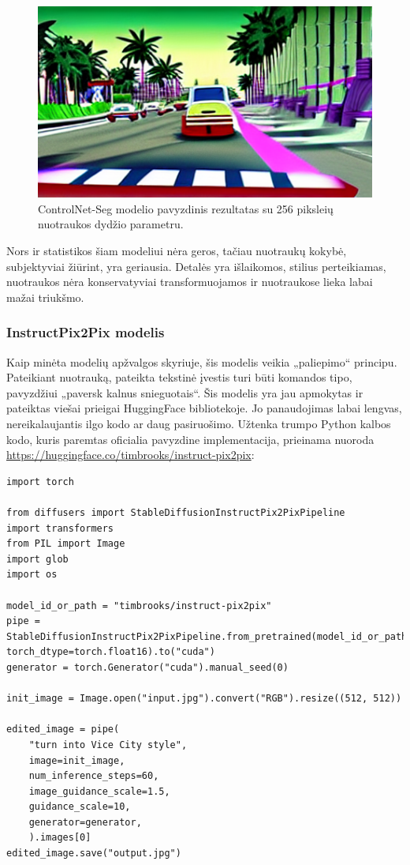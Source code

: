 \documentclass{VUMIFPSbakalaurinis}
\begin{document}
            \begin{figure}[H]
                \centering
                \includegraphics[scale=1]{img/diffusion/controlnet/256}
                \caption{ControlNet-Seg modelio pavyzdinis rezultatas su 256 piksleių nuotraukos dydžio parametru.}
                \label{img:mlp}
            \end{figure}

            Nors ir statistikos šiam modeliui nėra geros, tačiau nuotraukų kokybė, subjektyviai žiūrint, yra geriausia. Detalės yra išlaikomos, stilius perteikiamas, nuotraukos nėra konservatyviai transformuojamos ir nuotraukose lieka labai mažai triukšmo.

        \subsubsection{InstructPix2Pix modelis}
            Kaip minėta modelių apžvalgos skyriuje, šis modelis veikia „paliepimo“ principu. Pateikiant nuotrauką, pateikta tekstinė įvestis turi būti komandos tipo, pavyzdžiui „paversk kalnus snieguotais“. Šis modelis yra jau apmokytas ir pateiktas viešai prieigai HuggingFace bibliotekoje. Jo panaudojimas labai lengvas, nereikalaujantis ilgo kodo ar daug pasiruošimo. Užtenka trumpo Python kalbos kodo, kuris paremtas oficialia pavyzdine implementacija, prieinama nuoroda \href{https://huggingface.co/timbrooks/instruct-pix2pix}{https://huggingface.co/timbrooks/instruct-pix2pix}:

            \begin{lstlisting}
import torch

from diffusers import StableDiffusionInstructPix2PixPipeline
import transformers
from PIL import Image
import glob
import os

model_id_or_path = "timbrooks/instruct-pix2pix"
pipe = StableDiffusionInstructPix2PixPipeline.from_pretrained(model_id_or_path, torch_dtype=torch.float16).to("cuda")
generator = torch.Generator("cuda").manual_seed(0)

init_image = Image.open("input.jpg").convert("RGB").resize((512, 512))

edited_image = pipe(
    "turn into Vice City style",
    image=init_image,
    num_inference_steps=60,
    image_guidance_scale=1.5,
    guidance_scale=10,
    generator=generator,
    ).images[0]
edited_image.save("output.jpg")
            \end{lstlisting}
\end{document}
